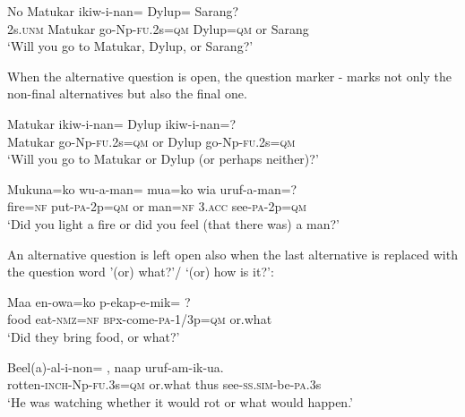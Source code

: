 \ea%
\label{ex:x1184}
\gll No  Matukar  ikiw-i-nan=  Dylup=    Sarang? \\
2s.\textsc{unm}  Matukar  go-Np-\textsc{fu}.2s=\textsc{qm}  Dylup=\textsc{qm}  or  Sarang      \\
\glt `Will you go to Matukar, Dylup, or Sarang?'
\z


When the alternative question is open, the question marker -  marks not only the non-final alternatives but also the final one. 

\ea%
\label{ex:x1185}
\gll Matukar  ikiw-i-nan=    Dylup  ikiw-i-nan=? \\
Matukar  go-Np-\textsc{fu}.2s=\textsc{qm}  or  Dylup  go-Np-\textsc{fu}.2s=\textsc{qm}      \\
\glt `Will you go to Matukar or Dylup (or perhaps neither)?'
\z





\ea%
\label{ex:x1186}
\gll Mukuna=ko  wu-a-man=    mua=ko  wia  uruf-a-man=? \\
fire=\textsc{nf}  put-\textsc{pa}-2p=\textsc{qm}  or  man=\textsc{nf}  3.\textsc{acc}  see-\textsc{pa}-2p=\textsc{qm}      \\
\glt `Did you light a fire or did you feel (that there was) a man?'
\z





An alternative question is left open also when the last alternative is replaced with the question word  '(or) what?'/ `(or) how is it?':

\ea%
\label{ex:x1350}
\gll Maa  en-owa=ko  p-ekap-e-mik=  ? \\
food  eat-\textsc{nmz}=\textsc{nf}  \textsc{bp}x-come-\textsc{pa}-1/3p=\textsc{qm}  or.what      \\
\glt `Did they bring food, or what?'
\z





\ea%
\label{ex:x1351}
\gll Beel(a)-al-i-non=  ,  naap  uruf-am-ik-ua. \\
rotten-\textsc{inch}-Np-\textsc{fu}.3s=\textsc{qm}  or.what  thus  see-\textsc{ss}.\textsc{sim}-be-\textsc{pa}.3s      \\
\glt `He was watching whether it would rot or what would happen.'
\z





